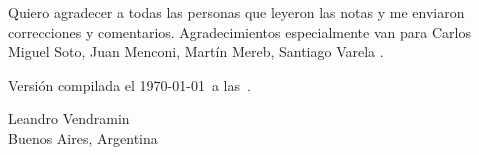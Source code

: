Quiero agradecer a todas las personas que leyeron las notas y me enviaron 
correcciones y comentarios. Agradecimientos especialmente van para
Carlos Miguel Soto, 
Juan Menconi, 
Martín Mereb, 
Santiago Varela
.

\medskip
Versión compilada el \today~a las~\currenttime.

\begin{flushright} 
Leandro Vendramin\\Buenos Aires, Argentina\par
\end{flushright}
